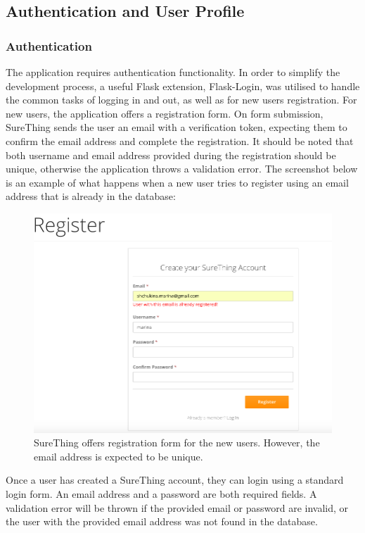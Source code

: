 \subsection{Authentication and User Profile}
\subsubsection*{Authentication}
The application requires authentication functionality. In order to simplify the development process, a useful Flask extension, Flask-Login, was utilised to handle the common tasks of logging in and out, as well as for new users registration. For new users, the application offers a registration form. On form submission, SureThing sends the user an email with a verification token, expecting them to confirm the email address and complete the registration. It should be noted that both username and email address provided during the registration should be unique, otherwise the application throws a validation error. The screenshot below is an example of what happens when a new user tries to register using an email address that is already in the database:

\begin{figure}[H]
	\begin{center}
		\includegraphics[width=.90\textwidth]{impl/images/registrationFormError}
		\caption{SureThing offers registration form for the new users. However, the email address is expected to be unique.} 
		\label{fig:registrationformerror}
	\end{center}
\end{figure}

Once a user has created a SureThing account, they can login using a standard login form.  An email address and a password are both required fields. A validation error will be thrown if the provided email or password are invalid, or the user with the provided email address was not found in the database.

